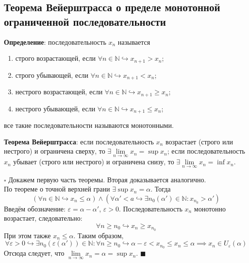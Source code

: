\documentclass[12pt, a4paper, reqno]{article}
\begin{document}
\subsection{Теорема Вейерштрасса о пределе монотонной ограниченной последовательности}

    \textbf{Определение}: последовательность $x_n$ называется
    \begin{enumerate}
        \item строго возрастающей, если $\forall n\in\mathbb{N} \hookrightarrow x_{n+1} > x_n$;
        \item строго убывающей, если $\forall n\in\mathbb{N} \hookrightarrow x_{n+1} < x_n$;
        \item нестрого возрастающей, если $\forall n\in\mathbb{N} \hookrightarrow x_{n+1} \geq x_n$;
        \item нестрого убывающей, если $\forall n\in\mathbb{N} \hookrightarrow x_{n+1} \leq x_n$;
    \end{enumerate}
    все такие последовательности называются монотонными.

    \textbf{Теорема Вейерштрасса}: если последовательность $x_n$ возрастает (строго или нестрого) и
    ограничена сверху, то $\exists\lim\limits_{n\to\infty} x_n = \sup x_n$; если последовательность
    $x_n$ убывает (строго или нестрого) и ограничена снизу, то $\exists\lim\limits_{n\to\infty}
    x_n = \inf x_n$.

    $\square$ Докажем первую часть теоремы. Вторая доказывается аналогично.\\
    По теореме о точной верхней грани $\exists\sup x_n = \alpha$. Тогда
    \begin{equation*}
        (\forall n\in\mathbb{N} \hookrightarrow x_n \leq \alpha)\wedge
        (\forall \alpha' < a \hookrightarrow \exists n_0(\alpha')\in\mathbb{N}: x_{n_0} > \alpha')
    \end{equation*}
    Введём обозначение: $\varepsilon = \alpha - \alpha'$, $\varepsilon > 0$. Последовательность
    $x_n$ монотонно возрастает, следовательно:
    \begin{equation*}
        \forall n \geq n_0 \hookrightarrow x_n \geq x_{n_0}
    \end{equation*}
    При этом также $x_n \leq \alpha$. Таким образом,
    \begin{equation*}
        \forall\varepsilon > 0 \hookrightarrow\exists n_0(\varepsilon(\alpha'))\in\mathbb{N}:
        \forall n \geq n_0 \hookrightarrow  \alpha- \varepsilon < x_{n_0} \leq x_n \leq \alpha
        \implies x_n\in U_{\varepsilon}(\alpha)
    \end{equation*}
    Отсюда следует, что $\lim\limits_{n\to\infty} x_n = \alpha = \sup x_n$. $\blacksquare$
\end{document}
